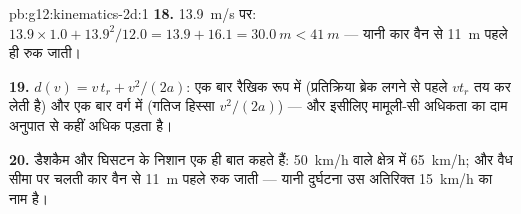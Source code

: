 \begin{solution}{pb:g12:kinematics-2d:1}
\textbf{18.} \qty{13.9}{m/s} पर: $13.9 \times 1.0 + 13.9^2/12.0 =
13.9 + 16.1 = \qty{30.0}{m} < \qty{41}{m}$ --- यानी कार वैन से \qty{11}{m} पहले ही रुक
जाती।

\textbf{19.} $d(v) = v\,t_r + v^2/(2a)$: एक बार रैखिक रूप में (प्रतिक्रिया ब्रेक लगने से पहले
$v t_r$ तय कर लेती है) और एक बार वर्ग में (गतिज हिस्सा $v^2/(2a)$) --- और इसीलिए
मामूली-सी अधिकता का दाम अनुपात से कहीं अधिक पड़ता है।

\textbf{20.} डैशकैम और घिसटन के निशान एक ही बात कहते हैं: \qty{50}{km/h} वाले क्षेत्र
में \qty{65}{km/h}; और वैध सीमा पर चलती कार वैन से \qty{11}{m} पहले रुक जाती --- यानी
दुर्घटना उस अतिरिक्त \qty{15}{km/h} का नाम है।
\end{solution}
